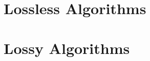 \documentclass[%
    a5paper,  
    footinclude=true,
    headinclude=true
fontsize=11pt,
]{scrbook}
\begin{document}

%


\frontmatter




\restoregeometry

\cleardoublepage


\cleardoublepage
\def\dir{frontbackmatter}



\cleardoublepage
\def\dir{frontbackmatter}



\cleardoublepage
\def\dir{frontbackmatter}



\cleardoublepage
\def\dir{frontbackmatter}



\mainmatter


\def\dir{chapters/introduction}


\def\dir{chapters/background}


\part{Lossless Algorithms} \label{part:one}

\def\dir{chapters/relwork}


\def\dir{chapters/l3c}


\def\dir{chapters/rc}


\part{Lossy Algorithms} \label{part:two}
\end{document}
